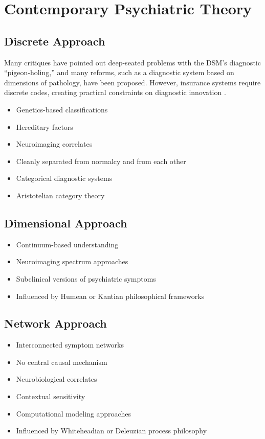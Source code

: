 \documentclass[a4paper]{article}
\begin{document}
\section{Contemporary Psychiatric Theory}


\subsection{Discrete Approach}

Many critiques have pointed out deep-seated problems with the DSM's diagnostic \enquote{pigeon-holing,} and many reforms, such as a diagnostic system based on dimensions of pathology, have been proposed. However, insurance systems require discrete codes, creating practical constraints on diagnostic innovation \cite{PubMedObjective}.

\begin{itemize}[leftmargin=2em]
    \item Genetics-based classifications
    \item Hereditary factors
    \item Neuroimaging correlates
    \item Cleanly separated from normalcy and from each other
    \item Categorical diagnostic systems
    \item Aristotelian category theory
\end{itemize}

\subsection{Dimensional Approach}

\begin{itemize}[leftmargin=2em]
    \item Continuum-based understanding
    \item Neuroimaging spectrum approaches
    \item Subclinical versions of psychiatric symptoms
    \item Influenced by Humean or Kantian philosophical frameworks
\end{itemize}

\subsection{Network Approach}

\begin{itemize}[leftmargin=2em]
    \item Interconnected symptom networks
    \item No central causal mechanism
    \item Neurobiological correlates
    \item Contextual sensitivity
    \item Computational modeling approaches
    \item Influenced by Whiteheadian or Deleuzian process philosophy
\end{itemize}
\end{document}
